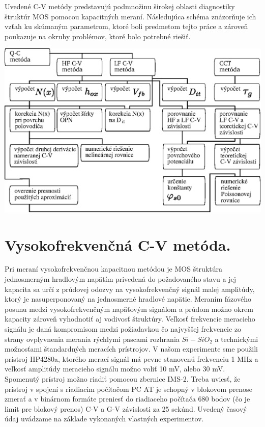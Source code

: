 Uvedené C-V metódy predstavujú podmnožinu širokej oblasti diagnostiky
štruktúr MOS pomocou kapacitných meraní.  Následujúca schéma
znázorňuje ich vzťah ku skúmaným parametrom, ktoré boli predmetom
tejto práce a zároveň poukazuje na okruhy problémov, ktoré bolo
potrebné riešiť.

\begin{diagram}
  \centering
  \includegraphics[width=\textwidth,height=\textheight,scale=0.7,keepaspectratio]{Figures/diagram-1.EPS}\label{diagram:1}
\end{diagram}

\section{Vysokofrekvenčná C-V metóda.}\label{sec:3.1}

Pri meraní vysokofrekvenčnou kapacitnou metódou je MOS štruktúra
jednosmerným hradlovým napätím privedená do požadovaného stavu a jej
kapacita sa určí z prúdovej odozvy na vysokofrekvenčný signál malej
amplitúdy, ktorý je nasuperponovaný na jednosmerné hradlové
napätie. Meraním fázového posunu medzi vysokofrekvenčným napäťovým
signálom a prúdom možno okrem kapacity zároveň vyhodnotiť aj vodivosť
štruktúry. Veľkosť frekvencie meracieho signálu je daná kompromisom
medzi požiadavkou čo najvyššej frekvencie zo strany ovplyvnenia
merania rýchlymi pascami rozhrania $Si-SiO_2$ a technickými možnosťami
štandardných meracích prístrojov.  V našom experimente sme použili
prístroj HP4280a, ktorého merací signál má pevne stanovenú frekvenciu
1 MHz a veľkosť amplitúdy meracieho signálu možno voliť 10 mV, alebo
30 mV.  Spomenutý prístroj možno riadiť pomocou zbernice IMS-2. Treba
uviesť, že prístroj v spojení s riadiacim počítačom PC AT je schopný v
blokovom prenose zmerať a v binárnom formáte preniesť do riadiaceho
počítača 680 bodov (čo je limit pre blokový prenos) C-V a G-V
závislosti za 25 sekúnd.  Uvedený časový údaj uvádzame na základe
vykonaných vlastných experimentov.

